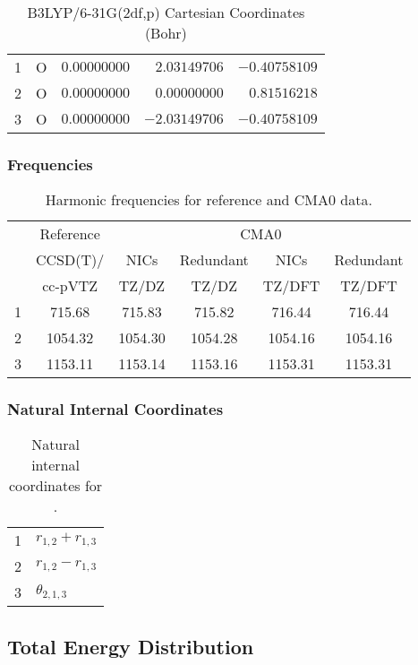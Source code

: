 \documentclass[10pt,oneside]{article}
\begin{document}
\begin{table}[h]
\centering
\caption{B3LYP/6-31G(2df,p) Cartesian Coordinates (Bohr)}
\begin{tabular}{llrrr}
\toprule
1  & O  & $ 0.00000000$ & $ 2.03149706$ & $-0.40758109$ \\
2  & O  & $ 0.00000000$ & $ 0.00000000$ & $ 0.81516218$ \\
3  & O  & $ 0.00000000$ & $-2.03149706$ & $-0.40758109$ \\
\bottomrule
\end{tabular}
\end{table}

\begin{table}[h!]
\subsubsection*{Frequencies}
\centering
\caption{Harmonic frequencies for reference and CMA0 data.}
\begin{tabular}{cccccc}
\toprule
{} & Reference & \multicolumn{4}{c}{CMA0} \\
{} &  CCSD(T)/ &    NICs &  Redundant &    NICs & Redundant \\
{} &   cc-pVTZ &   TZ/DZ &      TZ/DZ &  TZ/DFT &    TZ/DFT \\
\midrule
1 &    715.68 &  715.83 &     715.82 &  716.44 &    716.44 \\
2 &   1054.32 & 1054.30 &    1054.28 & 1054.16 &   1054.16 \\
3 &   1153.11 & 1153.14 &    1153.16 & 1153.31 &   1153.31 \\
\bottomrule
\end{tabular}
\end{table}

\begin{table}[h!]
\subsubsection*{Natural Internal Coordinates}
\centering
\caption{Natural internal coordinates for .}
\small
\begin{tabular}{ll}
\toprule
  1   & $r_{1,2} + r_{1,3}$ \\
  2   & $r_{1,2} - r_{1,3}$ \\
  3   & $\theta_{2,1,3}$ \\
\bottomrule
\end{tabular}
\end{table}

\begin{table}
\subsection*{Total Energy Distribution}
\centering\end{table}
\end{document}
